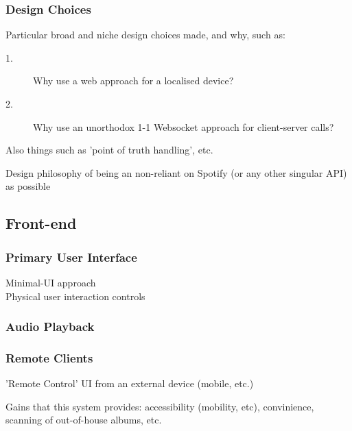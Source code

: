           \subsubsection{Design Choices}
              Particular broad and niche design choices made, and why, such as:
              \begin{description}
                  \item[1.] Why use a web approach for a localised device?
                  \item[2.] Why use an unorthodox 1-1 Websocket approach for client-server calls?
              \end{description}
              Also things such as 'point of truth handling', etc.
    
              Design philosophy of being an non-reliant on Spotify (or any other singular API) as possible
    
      \subsection{Front-end}
          \subsubsection{Primary User Interface}
    
              Minimal-UI approach \\
              Physical user interaction controls
    
          \subsubsection{Audio Playback}
    
          \subsubsection{Remote Clients}
              'Remote Control' UI from an external device (mobile, etc.)
    
              Gains that this system provides: accessibility (mobility, etc), convinience, scanning of out-of-house albums, etc.
      
